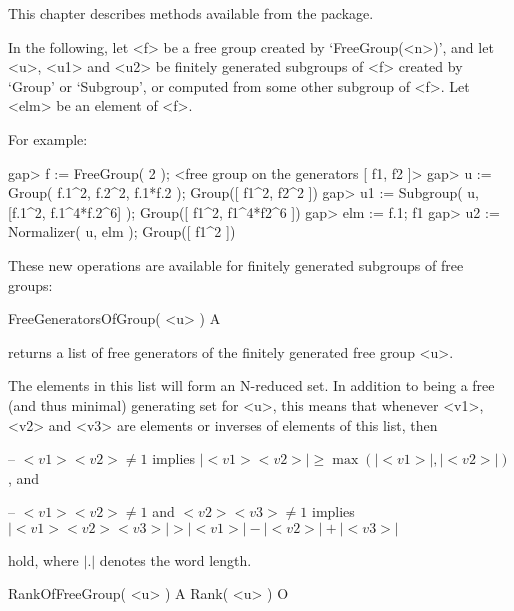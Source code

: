 


This chapter describes methods available from the {\FGA} package.

In the following, let <f> be a free group created by `FreeGroup(<n>)',
and let <u>, <u1> and <u2> be finitely generated subgroups of <f>
created by `Group' or `Subgroup', or computed from some other subgroup
of <f>.  Let <elm> be an element of <f>.

For example:

\beginexample
gap> f := FreeGroup( 2 );                                             
<free group on the generators [ f1, f2 ]>
gap> u := Group( f.1^2, f.2^2, f.1*f.2 );
Group([ f1^2, f2^2 ])
gap> u1 := Subgroup( u, [f.1^2, f.1^4*f.2^6] );
Group([ f1^2, f1^4*f2^6 ])
gap> elm := f.1;
f1
gap> u2 := Normalizer( u, elm );
Group([ f1^2 ])
\endexample


These new operations are available for finitely generated subgroups of
free groups:

\>FreeGeneratorsOfGroup( <u> ) A

returns a list of free generators of the finitely generated free group
<u>.

The elements in this list will form an N-reduced set.  In addition to
being a free (and thus minimal) generating set for <u>, this means
that whenever <v1>, <v2> and <v3> are elements or inverses of elements
of this list, then

\beginlist%
  \item{--}
    $<v1><v2> \neq 1$ implies $|<v1><v2>| \geq \max(|<v1>|, |<v2>|)$, and
  \item{--}
    $<v1><v2> \neq 1$ and $<v2><v3> \neq 1$ implies
    $|<v1><v2><v3>| > |<v1>| - |<v2>| + |<v3>|$
\endlist

hold, where $|.|$ denotes the word length.

\>RankOfFreeGroup( <u> ) A
\>Rank( <u> ) O

